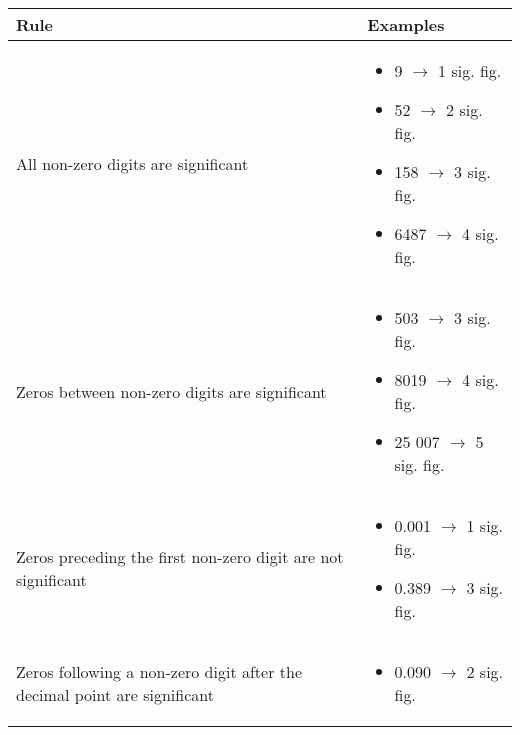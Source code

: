 \documentclass[../main]{subfiles}
\begin{document}
\begin{center}
  \begin{tabular}{|p{4cm} | p{4cm} |}
    \hline
    Rule    &   Examples \\
    \hline
    All non-zero digits are significant  &
                                           \begin{itemize}
                                           \item 9 \(\rightarrow\) 1 sig. fig.
                                           \item 52 \(\rightarrow\) 2 sig. fig.
                                           \item 158 \(\rightarrow\) 3 sig. fig.
                                           \item 6487 \(\rightarrow\) 4 sig. fig.
                                           \end{itemize} \\ \hline
    Zeros between non-zero digits are significant &
                                                    \begin{itemize}
                                                    \item 503 \(\rightarrow\) 3 sig. fig.
                                                    \item 8019 \(\rightarrow\) 4 sig. fig.
                                                    \item 25 007 \(\rightarrow\) 5 sig. fig.
                                                    \end{itemize} \\ \hline
    Zeros preceding the first non-zero digit are not significant &
                                                                   \begin{itemize}
                                                                   \item 0.001 \(\rightarrow\) 1 sig. fig.
                                                                   \item 0.389 \(\rightarrow\) 3 sig. fig.
                                                                   \end{itemize} \\ \hline
    Zeros following a non-zero digit after the decimal point are significant &
                                                                               \begin{itemize}
                                                                               \item  0.090 \(\rightarrow\) 2 sig. fig.

\end{itemize}
\end{tabular}
\end{center}
\end{document}
